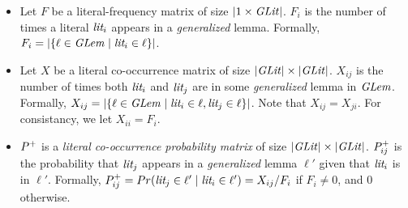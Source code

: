 \begin{itemize}
    \item Let $F$ be a literal-frequency matrix of size $|1\times\mathit{GLit}|$. $F_i$ is the number of times a literal $\textit{lit}_i$ appears in a \emph{generalized} lemma.
    Formally, $F_i = |\{ \ell \in \mathit{GLem} \mid \textit{lit}_i \in \ell\}|$.
    \item Let $X$ be a literal co-occurrence matrix of size $|\mathit{GLit}| \times |\mathit{GLit}|$. $X_{ij}$ is the number of times both $\textit{lit}_i$ and $\textit{lit}_j$ are in some \emph{generalized} lemma in $\mathit{GLem}$. Formally, $X_{ij} = |\{ \ell \in \mathit{GLem} \mid \textit{lit}_i \in \ell, \textit{lit}_j \in \ell\}|$.
    Note that $X_{ij} = X_{ji}$. For consistancy, we let $X_{ii} = F_{i}$.
    \item $P^+$ is a \emph{literal co-occurrence probability matrix} of size $|\mathit{GLit}| \times |\mathit{GLit}|$. $P^+_{ij}$ is the probability that $\textit{lit}_j$ appears in a \emph{generalized} lemma $\ell'$ given that $\textit{lit}_i$ is in $\ell'$. Formally, $P^+_{ij} = Pr(\textit{lit}_j \in \ell' \mid \textit{lit}_i \in \ell') = X_{ij}/F_i$ if $F_i \neq 0$, and $0$ otherwise. 
    
\end{itemize}

